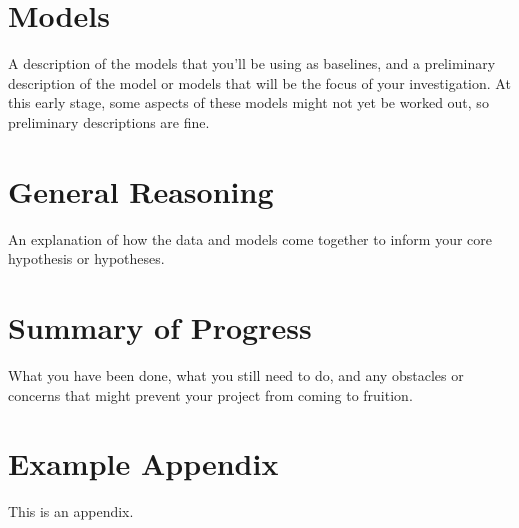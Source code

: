 \documentclass[11pt]{article}
\begin{document}
\section{Models} 

A description of the models that you'll be using as baselines, and a preliminary description of the model or models that will be the focus of your investigation. At this early stage, some aspects of these models might not yet be worked out, so preliminary descriptions are fine.

\section{General Reasoning} 

An explanation of how the data and models come together to inform your core hypothesis or hypotheses.

\section{Summary of Progress} 

What you have been done, what you still need to do, and any obstacles or concerns that might prevent your project from coming to fruition.



\appendix

\section{Example Appendix}\label{sec:appendix}

This is an appendix.
\end{document}

